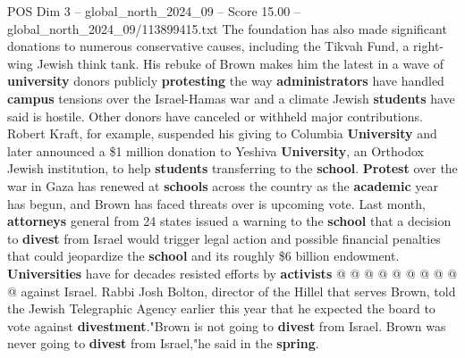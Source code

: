 \begin{textsample}{POS Dim 3 – global\_north\_2024\_09 – Score 15.00 – global\_north\_2024\_09/113899415.txt}
The foundation has also made significant donations to numerous conservative causes, including the Tikvah Fund, a right-wing Jewish think tank.
His rebuke of Brown makes him the latest in a wave of \textbf{university} donors publicly \textbf{protesting} the way \textbf{administrators} have handled \textbf{campus} tensions over the Israel-Hamas war and a climate Jewish \textbf{students} have said is hostile.
Other donors have canceled or withheld major contributions.
Robert Kraft, for example, suspended his giving to Columbia \textbf{University} and later announced a \$1 million donation to Yeshiva \textbf{University}, an Orthodox Jewish institution, to help \textbf{students} transferring to the \textbf{school}. \textbf{Protest} over the war in Gaza has renewed at \textbf{schools} across the country as the \textbf{academic} year has begun, and Brown has faced threats over is upcoming vote.
Last month, \textbf{attorneys} general from 24 states issued a warning to the \textbf{school} that a decision to \textbf{divest} from Israel would trigger legal action and possible financial penalties that could jeopardize the \textbf{school} and its roughly \$6 billion endowment. \textbf{Universities} have for decades resisted efforts by \textbf{activists} @ @ @ @ @ @ @ @ @ @ against Israel.
Rabbi Josh Bolton, director of the Hillel that serves Brown, told the Jewish Telegraphic Agency earlier this year that he expected the board to vote against \textbf{divestment}."Brown is not going to \textbf{divest} from Israel.
Brown was never going to \textbf{divest} from Israel,"he said in the \textbf{spring}.

\end{textsample}
